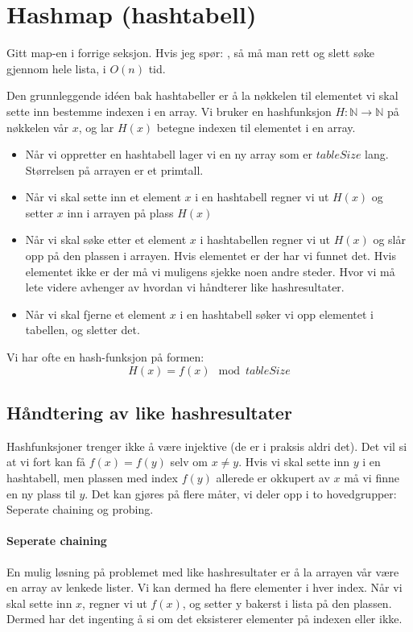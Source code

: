 \section{Hashmap (hashtabell)} \label{hashmap}
Gitt map-en i forrige seksjon. Hvis jeg spør: , så må man rett og slett søke gjennom hele lista, i $ O(n) $ tid. 

Den grunnleggende idéen bak hashtabeller er å la nøkkelen til elementet vi skal sette inn bestemme indexen i en array. Vi bruker en hashfunksjon $ H:\mathbb{N}\rightarrow\mathbb{N} $ på nøkkelen vår $ x $, og lar $ H(x) $ betegne indexen til elementet i en array. 

\begin{itemize}
\item Når vi oppretter en hashtabell lager vi en ny array som er $ tableSize $ lang. Størrelsen på arrayen er et primtall. 
\item Når vi skal sette inn et element $ x $ i en hashtabell regner vi ut $ H(x) $ og setter $ x $ inn i arrayen på plass $ H(x) $
\item Når vi skal søke etter et element $ x $ i hashtabellen regner vi ut $ H(x) $ og slår opp på den plassen i arrayen. Hvis elementet er der har vi funnet det. Hvis elementet ikke er der må vi muligens sjekke noen andre steder. Hvor vi må lete videre avhenger av hvordan vi håndterer like hashresultater. 
\item Når vi skal fjerne et element $ x $ i en hashtabell søker vi opp elementet i tabellen, og sletter det. 
\end{itemize}

\noindent Vi har ofte en hash-funksjon på formen:
\[ H(x) = f(x) \mod tableSize \]


\subsection{Håndtering av like hashresultater}
Hashfunksjoner trenger ikke å være injektive (de er i praksis aldri det). Det vil si at vi fort kan få $ f(x) = f(y) $ selv om $ x \neq y $. Hvis vi skal sette inn $ y $ i en hashtabell, men plassen med index $ f(y) $ allerede er okkupert av $ x $ må vi finne en ny plass til $ y $. Det kan gjøres på flere måter, vi deler opp i to hovedgrupper: Seperate chaining og probing. 


\paragraph{Seperate chaining}
En mulig løsning på problemet med like hashresultater er å la arrayen vår være en array av lenkede lister. Vi kan dermed ha flere elementer i hver index. Når vi skal sette inn $ x $, regner vi ut $ f(x) $, og setter y bakerst i lista på den plassen. Dermed har det ingenting å si om det eksisterer elementer på indexen eller ikke. 

